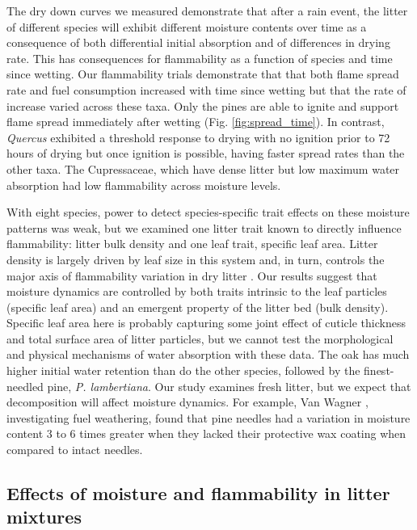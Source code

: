 \documentclass[letterpaper,12pt]{article}
\begin{document}
The dry down curves we measured demonstrate that after a rain event, the litter
of different species will exhibit different moisture contents over time as a
consequence of both differential initial absorption and of differences in
drying rate. This has consequences for flammability as a function of species
and time since wetting. Our flammability trials demonstrate that that both
flame spread rate and fuel consumption increased with time since wetting but
that the rate of increase varied across these taxa. Only the pines are able to
ignite and support flame spread immediately after wetting (Fig.
\ref{fig:spread_time}). In contrast, \emph{Quercus} exhibited a threshold
response to drying with no ignition prior to 72 hours of drying but once
ignition is possible, having faster spread rates than the other taxa. The
Cupressaceae, which have dense litter but low maximum water absorption had low
flammability across moisture levels.

With eight species, power to detect species-specific trait effects on these
moisture patterns was weak, but we examined one litter trait known to directly
influence flammability: litter bulk density and one leaf trait, specific leaf
area. Litter density is largely driven by leaf size in this system and, in
turn, controls the major axis of flammability variation in dry litter
\citep{Magalhaes+Schwilk-2012}. Our results suggest that moisture dynamics are
controlled by both traits intrinsic to the leaf particles (specific leaf area)
and an emergent property of the litter bed (bulk density). Specific leaf area
here is probably capturing some joint effect of cuticle thickness and total
surface area of litter particles, but we cannot test the morphological and
physical mechanisms of water absorption with these data. The oak has much
higher initial water retention than do the other species, followed by the
finest-needled pine, \emph{P. lambertiana}. Our study examines fresh litter,
but we expect that decomposition will affect moisture dynamics. For example,
Van Wagner \citep{Van_Wagner-1969}, investigating fuel weathering, found that
pine needles had a variation in moisture content 3 to 6 times greater when they
lacked their protective wax coating when compared to intact needles.

\subsection*{Effects of moisture and flammability in litter mixtures}
\end{document}
